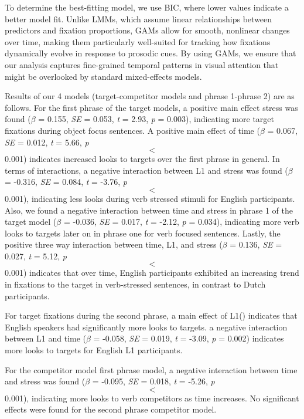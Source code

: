 To determine the best-fitting model, we use BIC, where lower values indicate a better model fit. Unlike LMMs, which assume linear relationships between predictors and fixation proportions, GAMs allow for smooth, nonlinear changes over time, making them particularly well-suited for tracking how fixations dynamically evolve in response to prosodic cues. By using GAMs, we ensure that our analysis captures fine-grained temporal patterns in visual attention that might be overlooked by standard mixed-effects models.

Results of our 4 models (target-competitor models and phrase 1-phrase 2) are as follows. For the first phrase of the target models, a positive main effect stress was found ($\beta$ = 0.155, \textit{SE} = 0.053, \textit{t} = 2.93, \textit{p} = 0.003), indicating more target fixations during object focus sentences. A positive main effect of time ($\beta$ = 0.067, \textit{SE} = 0.012, \textit{t} = 5.66, \textit{p} $$<$$ 0.001)
 indicates increased looks to targets over the first phrase in general. In terms of interactions, a negative interaction between L1 and stress was found ($\beta$ = -0.316, \textit{SE} = 0.084, \textit{t} = -3.76, \textit{p} $$<$$ 0.001), indicating less looks during verb stressed stimuli for English participants. Also, we found a negative interaction between time and stress in phrase 1 of the target model ($\beta$ = -0.036, \textit{SE} = 0.017, \textit{t} = -2.12, \textit{p} = 0.034), indicating more verb looks to targets later on in phrase one for verb focused sentences. Lastly, the positive three way interaction between time, L1, and stress ($\beta$ = 0.136, \textit{SE} = 0.027, \textit{t} = 5.12, \textit{p} $$<$$ 0.001) indicates that over time, English participants exhibited an increasing trend in fixations to the target in verb-stressed sentences, in contrast to Dutch participants.
 
 For target fixations during the second phrase, a main effect of L1() indicates that English speakers had significantly more looks to targets. a negative interaction between L1 and time ($\beta$ = -0.058, \textit{SE} = 0.019, \textit{t} = -3.09, \textit{p} = 0.002) indicates more looks to targets for English L1 participants.

For the competitor model first phrase model, a negative interaction between time and stress was found ($\beta$ = -0.095, \textit{SE} = 0.018, \textit{t} = -5.26, \textit{p} $$<$$ 0.001), indicating more looks to verb competitors as time increases. No significant effects were found for the second phrase competitor model.



